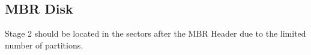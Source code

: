\subsection{MBR Disk}

Stage 2 should be located in the sectors after the MBR Header due to the limited number of partitions.
